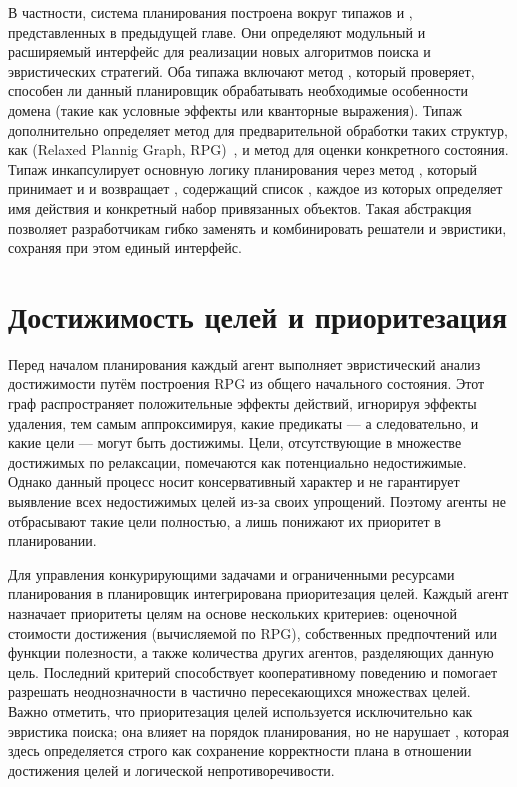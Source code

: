 В частности, система планирования построена вокруг
типажов  и , представленных в предыдущей главе.
Они определяют модульный и расширяемый интерфейс
для реализации новых алгоритмов поиска и эвристических стратегий.
Оба типажа включают метод ,
который проверяет, способен ли данный планировщик обрабатывать
необходимые особенности домена (такие как условные эффекты или кванторные выражения).
Типаж  дополнительно определяет метод 
для предварительной обработки таких структур,
как 
(Relaxed Plannig Graph, RPG)~\cite{BLUM1997281,Hoffmann_2001,bryce2007planninggraph},
и метод  для оценки конкретного состояния.
Типаж  инкапсулирует основную логику планирования
через метод , который принимает  и 
и возвращает , содержащий список ,
каждое из которых определяет имя действия и конкретный набор привязанных объектов.
Такая абстракция позволяет разработчикам гибко заменять и комбинировать
решатели и эвристики, сохраняя при этом единый интерфейс.

\section{Достижимость целей и приоритезация}

Перед началом планирования каждый агент выполняет эвристический анализ достижимости
путём построения RPG из общего начального состояния.
Этот граф распространяет положительные эффекты действий, игнорируя эффекты удаления,
тем самым аппроксимируя, какие предикаты
--- а следовательно, и какие цели --- могут быть достижимы.
Цели, отсутствующие в множестве достижимых по релаксации, помечаются как потенциально недостижимые.
Однако данный процесс носит консервативный характер и не гарантирует
выявление всех недостижимых целей из-за своих упрощений.
Поэтому агенты не отбрасывают такие цели полностью, а лишь понижают их приоритет в планировании.

Для управления конкурирующими задачами и ограниченными ресурсами планирования
в планировщик интегрирована приоритезация целей.
Каждый агент назначает приоритеты целям на основе нескольких критериев:
оценочной стоимости достижения (вычисляемой по RPG),
собственных предпочтений или функции полезности,
а также количества других агентов, разделяющих данную цель.
Последний критерий способствует кооперативному поведению
и помогает разрешать неоднозначности в частично пересекающихся множествах целей.
Важно отметить, что приоритезация целей используется исключительно как эвристика поиска;
она влияет на порядок планирования, но не нарушает ,
которая здесь определяется строго как сохранение корректности плана
в отношении достижения целей и логической непротиворечивости.

